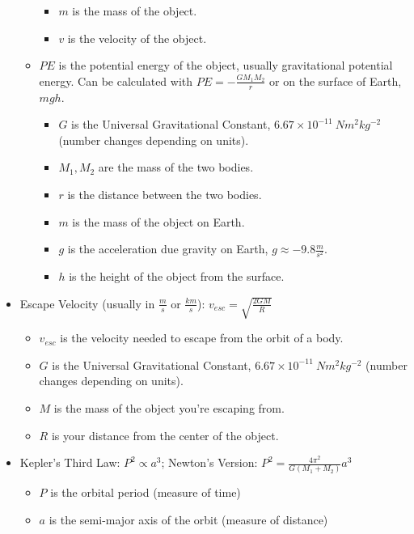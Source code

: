 \documentclass[letterpaper,14pt]{extarticle}
\begin{document}
\begin{itemize}
\begin{itemize}
        \begin{itemize}
            \item $m$ is the mass of the object.
            \item $v$ is the velocity of the object.
        \end{itemize}
        \item $PE$ is the potential energy of the object, usually gravitational potential energy. Can be calculated with $PE = -\frac{GM_1M_2}{r}$ or on the surface of Earth, $mgh$.
        \begin{itemize}
            \item $G$ is the Universal Gravitational Constant, $6.67 \times 10^{-11}\ Nm^2kg^{-2}$ (number changes depending on units).
            \item $M_1, M_2$ are the mass of the two bodies.
            \item $r$ is the distance between the two bodies.
            \item $m$ is the mass of the object on Earth.
            \item $g$ is the acceleration due gravity on Earth, $g \approx -9.8 \frac{m}{s^2}$.
            \item $h$ is the height of the object from the surface.
        \end{itemize}
    \end{itemize}
    \item Escape Velocity (usually in $\frac{m}{s}$ or $\frac{km}{s}$): $v_{esc} = \sqrt{\frac{2GM}{R}}$
    \begin{itemize}
        \item $v_{esc}$ is the velocity needed to escape from the orbit of a body.
        \item $G$ is the Universal Gravitational Constant, $6.67 \times 10^{-11}\ Nm^2kg^{-2}$ (number changes depending on units).
        \item $M$ is the mass of the object you're escaping from.
        \item $R$ is your distance from the center of the object.
    \end{itemize}
    \item Kepler's Third Law: $P^2 \propto a^3$; Newton's Version: $P^2 = \frac{4\pi^2}{G(M_1 + M_2)}a^3$
    \begin{itemize}
        \item $P$ is the orbital period (measure of time)
        \item $a$ is the semi-major axis of the orbit (measure of distance)

\end{itemize}
\end{itemize}
\end{document}
